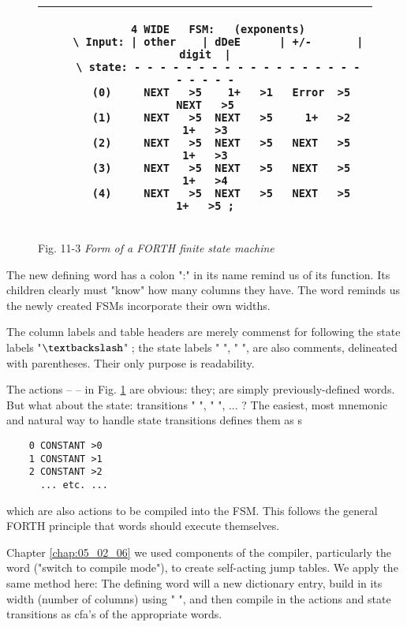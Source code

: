 \begin{figure}[H]
	\centering
    \begin{tabular}{|c|}
        \hline
        \begin{lstlisting}
    4 WIDE   FSM:   (exponents)
    \ Input: | other    | dDeE      | +/-       | digit  |
    \ state: - - - - - - - - - - - - - - - - - - - - - - -
     (0)     NEXT   >5    1+   >1   Error  >5   NEXT   >5
     (1)     NEXT   >5  NEXT   >5     1+   >2     1+   >3
     (2)     NEXT   >5  NEXT   >5   NEXT   >5     1+   >3
     (3)     NEXT   >5  NEXT   >5   NEXT   >5     1+   >4
     (4)     NEXT   >5  NEXT   >5   NEXT   >5     1+   >5 ;
        \end{lstlisting} \\
        \hline
    \end{tabular}
    \caption{Fig. 11-3 \textit{Form of a FORTH finite state machine}}
    \label{fig:11_03}
\end{figure}

The new defining word  has a colon ":" in its name remind us of its function. Its children clearly must "know" how many columns they have. The word  reminds us the newly created FSMs incorporate their own widths.

The column labels and table headers are merely commenst for following the state labels "$\textbackslash$" ; the state labels "  ", "  ", \etc are also comments, delineated with parentheses. Their only purpose is readability.

The actions --  -- in Fig. \ref{fig:11_03} are obvious: they; are simply previously-defined words. But what about the state: transitions "  ", "  ", ... ? The easiest, most mnemonic and natural way to handle state transitions defines them as s

\begin{lstlisting}
    0 CONSTANT >0
    1 CONSTANT >1
    2 CONSTANT >2
      ... etc. ...
\end{lstlisting}

which are also actions to be compiled into the FSM. This follows the general FORTH principle that words should execute themselves.

 Chapter \ref{chap:05_02_06} we used components of the compiler, particularly the  word \bc{]} ("switch to compile mode"), to create self-acting jump tables. We apply the same method here: The defining word  will  a new dictionary entry, build in its width (number of columns) using " \bc{,} ", and then compile in the actions and state transitions as cfa’s of the appropriate words.

